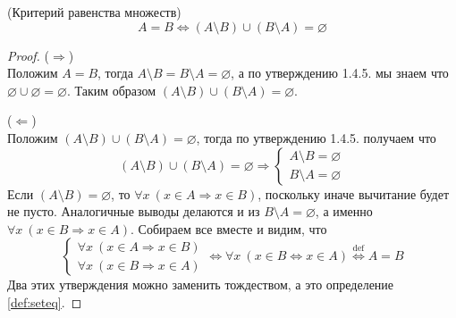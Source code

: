 \begin{statement}
(Критерий равенства множеств)\\
\[A=B\iff (A\setminus B)\cup(B\setminus A)=\varnothing\]
\end{statement}
\begin{proof}
($\Rightarrow$)\\
Положим $A=B$, тогда $A\setminus B=B\setminus A=\varnothing$, а по утверждению 1.4.5. мы знаем что $\varnothing\cup\varnothing=\varnothing$. Таким образом $(A\setminus B)\cup(B\setminus A)=\varnothing$.

($\Leftarrow$)\\
Положим $(A\setminus B)\cup(B\setminus A)=\varnothing$, тогда по утверждению 1.4.5. получаем что
\[(A\setminus B)\cup(B\setminus A)=\varnothing
\Rightarrow
\begin{cases}
A\setminus B=\varnothing\\
B\setminus A=\varnothing
\end{cases}\]
Если $(A\setminus B)=\varnothing$, то $\forall x\ (x\in A\Rightarrow x\in B)$, поскольку иначе вычитание будет не пусто. Аналогичные выводы делаются и из $B\setminus A=\varnothing$, а именно $\forall x\ (x\in B\Rightarrow x\in A)$. Собираем все вместе и видим, что
\[\begin{cases}
\forall x\ (x\in A\Rightarrow x\in B)\\
\forall x\ (x\in B\Rightarrow x\in A)
\end{cases}\iff
\forall x\ (x\in B\iff x\in A)\overset{\mathrm{def}}{\iff} A=B\]
Два этих утверждения можно заменить тождеством, а это определение \ref{def:seteq}.
\end{proof}
